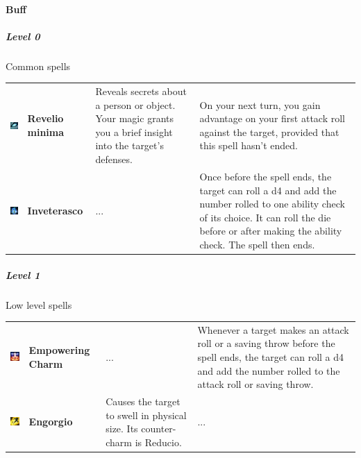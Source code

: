 \paragraph{Buff} 

\subparagraph{Level 0} 
Common spells \\
\begin{tabular}{ m{2cm}m{3cm}m{4cm}m{6cm} } 
	\includegraphics[width=2cm]{../Pictures/Gameplay/Spells/Icon/Revelio_minima_spell_icon.jpg} & \textbf{Revelio minima} & Reveals secrets about a person or object. Your magic grants you a brief insight into the target's defenses. & On your next turn, you gain advantage on your first attack roll against the target, provided that this spell hasn't ended. \\ 
   \includegraphics[width=2cm]{../Pictures/Gameplay/Spells/Icon/Inveterasco_spell_icon.png} & \textbf{Inveterasco} & ... & Once before the spell ends, the target can roll a d4 and add the number rolled to one ability check of its choice. It can roll the die before or after making the ability check. The spell then ends. \\ %
\end{tabular}

\subparagraph{Level 1} 
Low level spells \\
\begin{tabular}{ m{2cm}m{3cm}m{4cm}m{6cm} } 
	\includegraphics[width=2cm]{../Pictures/Gameplay/Spells/Icon/Empowering_spell_icon.png} & \textbf{Empowering Charm} & ... & Whenever a target makes an attack roll or a saving throw before the spell ends, the target can roll a d4 and add the number rolled to the attack roll or saving throw. \\ %
\includegraphics[width=2cm]{../Pictures/Gameplay/Spells/Icon/Engorgio_spell_icon.png} & \textbf{Engorgio} & Causes the target to swell in physical size. Its counter-charm is Reducio. & ... \\ 
\end{tabular}

